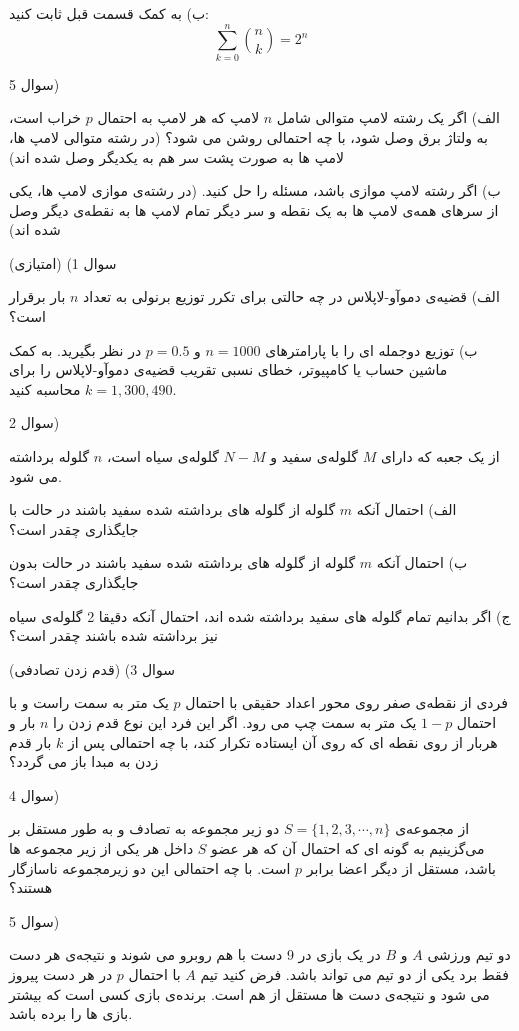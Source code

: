 \documentclass[10pt,letterpaper]{article}
\begin{document}
ب) به کمک قسمت قبل ثابت کنید:
$$
\sum_{k=0}^n\binom{n}{k}=2^n
$$

سوال 5)

الف) اگر یک رشته لامپ متوالی شامل $n$ لامپ که هر لامپ به احتمال $p$ خراب است، به ولتاژ برق وصل شود، با چه احتمالی روشن می شود؟ (در رشته متوالی لامپ ها، لامپ ها به صورت پشت سر هم به یکدیگر وصل شده اند)

ب) اگر رشته لامپ موازی باشد، مسئله را حل کنید. (در رشته‌ی موازی لامپ ها، یکی از سرهای همه‌ی لامپ ها به یک نقطه و سر دیگر تمام لامپ ها به نقطه‌ی دیگر وصل شده اند)

سوال 1) (امتیازی)

الف) قضیه‌ی دموآو-لاپلاس در چه حالتی برای تکرر توزیع برنولی به تعداد $n$ بار برقرار است؟

ب) توزیع دوجمله ای را با پارامترهای $n=1000$ و $p=0.5$ در نظر بگیرید. به کمک ماشین حساب یا کامپیوتر، خطای نسبی تقریب قضیه‌ی دموآو-لاپلاس را برای $k=1,300,490$ محاسبه کنید.

سوال 2) 

از یک جعبه که دارای $M$ گلوله‌ی سفید و $N-M$ گلوله‌ی سیاه است، $n$ گلوله برداشته می شود.

الف)
احتمال آنکه $m$ گلوله از گلوله های برداشته شده سفید باشند در حالت با جایگذاری چقدر است؟

ب)
احتمال آنکه $m$ گلوله از گلوله های برداشته شده سفید باشند در حالت بدون جایگذاری چقدر است؟

ج) اگر بدانیم تمام گلوله های سفید برداشته شده اند، احتمال آنکه دقیقا 2 گلوله‌ی سیاه نیز برداشته شده باشند چقدر است؟

سوال 3) (قدم زدن تصادفی) 

فردی از نقطه‌ی صفر روی محور اعداد حقیقی با احتمال $p$ یک متر به سمت راست و با احتمال $1-p$ یک متر به سمت چپ می  رود. اگر این فرد این نوع قدم زدن را $n$ بار و هربار از روی نقطه ای که روی آن ایستاده تکرار کند، با چه احتمالی پس از $k$ بار قدم زدن به مبدا باز می گردد؟

سوال 4) 

از مجموعه‌ی
 $
S=\{1,2,3,\cdots ,n\}
$
 دو زیر مجموعه به تصادف و به طور مستقل بر می‌گزینیم به گونه ای که احتمال آن که هر عضو $S$ داخل هر یکی از زیر مجموعه ها باشد، مستقل از دیگر اعضا برابر $p$ است. با چه احتمالی این دو زیرمجموعه ناسازگار هستند؟

سوال 5) 

دو تیم ورزشی $A$ و $B$ در یک بازی در 9 دست با هم روبرو می شوند و نتیجه‌ی هر دست فقط برد یکی از دو تیم می تواند باشد. فرض کنید تیم $A$ با احتمال $p$ در هر دست پیروز می شود و نتیجه‌ی دست ها مستقل از هم است. برنده‌ی بازی کسی است که بیشتر بازی ها را برده باشد.
\end{document}
